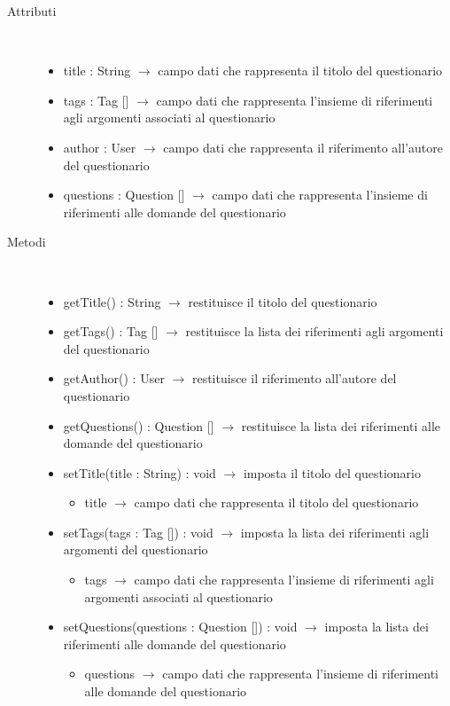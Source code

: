 \begin{description}
\item[Attributi] \hfill \\
\vspace{-7mm}
\begin{itemize}
	\item title : String $\rightarrow$ campo dati che rappresenta il titolo del questionario
	\item tags : Tag [] $\rightarrow$ campo dati che rappresenta l'insieme di riferimenti agli argomenti associati al questionario
	\item author : User $\rightarrow$ campo dati che rappresenta il riferimento all'autore del questionario
	\item questions : Question [] $\rightarrow$ campo dati che rappresenta l'insieme di riferimenti alle domande del questionario
\end{itemize}

\item[Metodi] \hfill \\
\vspace{-7mm}
\begin{itemize}
	\item getTitle() : String $\rightarrow$ restituisce il titolo del questionario
	\item getTags() : Tag [] $\rightarrow$ restituisce la lista dei riferimenti agli argomenti del questionario
	\item getAuthor() : User $\rightarrow$ restituisce il riferimento all'autore del questionario
	\item getQuestions() : Question [] $\rightarrow$ restituisce la lista dei riferimenti alle domande del questionario
	\item setTitle(title : String) : void $\rightarrow$ imposta il titolo del questionario\begin{itemize}
		\item title $\rightarrow$ campo dati che rappresenta il titolo del questionario
	\end{itemize}
	
	\item setTags(tags : Tag []) : void $\rightarrow$ imposta la lista dei riferimenti agli argomenti del questionario\begin{itemize}
		\item tags $\rightarrow$ campo dati che rappresenta l'insieme di riferimenti agli argomenti associati al questionario
	\end{itemize}
	
	\item setQuestions(questions : Question []) : void $\rightarrow$ imposta la lista dei riferimenti alle domande del questionario\begin{itemize}
		\item questions $\rightarrow$ campo dati che rappresenta l'insieme di riferimenti alle domande del questionario
	\end{itemize}
	
\end{itemize}

\end{description}

